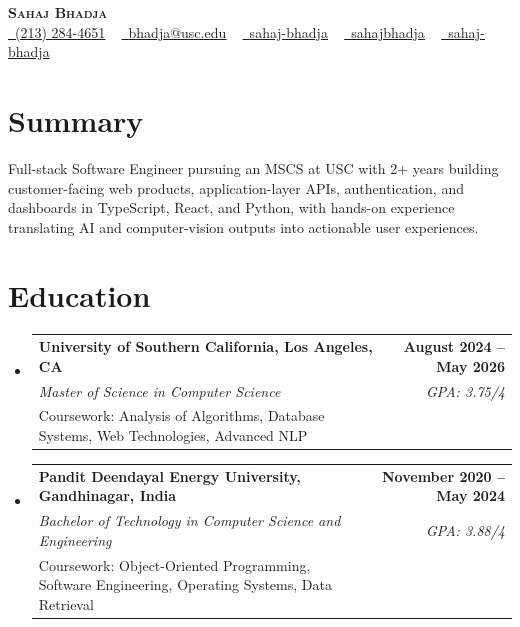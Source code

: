 \documentclass[letterpaper,10pt]{article}
\makeatletter
\newcommand{\resumeEduSubheading}[5]{\vspace{-1pt}\item\begin{tabular*}{1.0\textwidth}[t]{l@{\extracolsep{\fill}}r}\textbf{#1} & \textbf{\small #2} \\\textit{\small #3} & \textit{\small #4} \\\small #5 & \\\end{tabular*}\vspace{-4pt}}
\newcommand{\resumeSubHeadingListStart}{\begin{itemize}[leftmargin=0.0in, label={}]}
\newcommand{\resumeSubHeadingListEnd}{\end{itemize}}
\makeatother
\begin{document}
\begin{center}
{\Huge \scshape \textbf{Sahaj Bhadja}} \\ \vspace{1pt}
\small \href{tel:(213) 284-4651}{\faPhone\ \underline{(213) 284-4651}} ~ \href{mailto: bhadja@usc.edu}{\raisebox{-0.2\height}\faEnvelope\ \underline{bhadja@usc.edu}} ~
\href{https://www.linkedin.com/in/sahaj-bhadja/}{\raisebox{-0.2\height}\faLinkedin\ \underline{sahaj-bhadja}} ~ \href{https://github.com/SAHAJ-BHADJA}{\raisebox{-0.2\height}\faGithub\ \underline{sahajbhadja}} ~
\href{https://sahaj-bhadja.vercel.app/}{\raisebox{-0.2\height}\faGlobe\ \underline{sahaj-bhadja}}
\end{center}
\vspace{-16pt}
\section{Summary}
\begin{itemize}[leftmargin=0.15in, label={}]
\small{\item{Full-stack Software Engineer pursuing an MSCS at USC with 2+ years building customer-facing web products, application-layer APIs, authentication, and dashboards in TypeScript, React, and Python, with hands-on experience translating AI and computer-vision outputs into actionable user experiences.}}
\end{itemize}
\vspace{-6pt}
\section{Education}
\resumeSubHeadingListStart
\resumeEduSubheading{University of Southern California, Los Angeles, CA}{August 2024 -- May 2026}{Master of Science in Computer Science}{GPA: 3.75/4}{Coursework: Analysis of Algorithms, Database Systems, Web Technologies, Advanced NLP}
\vspace{-9pt}
\resumeEduSubheading{Pandit Deendayal Energy University, Gandhinagar, India}{November 2020 -- May 2024}{Bachelor of Technology in Computer Science and Engineering}{GPA: 3.88/4}{Coursework: Object-Oriented Programming, Software Engineering, Operating Systems, Data Retrieval}
\resumeSubHeadingListEnd
\vspace{-6pt}
\end{document}
